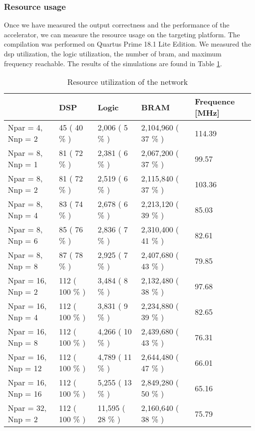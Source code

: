 \subsubsection{Resource usage}
%
Once we have measured the output correctness and the performance of the accelerator, we can measure the resource usage on the targeting platform. The compilation was performed on Quartus Prime 18.1 Lite Edition. We measured the \acrshort{dsp} utilization, the logic utilization, the number of \acrfull{bram}, and maximum frequency reachable. The results of the simulations are found in Table \ref{tab:res-simu}.
%
\begin{table}[H]
\begin{tabular}{|l|l|l|l|l|}
\hline
     & DSP & Logic  & BRAM & Frequence [MHz] \\ \hline
    Npar = 4, Nnp = 2 & 45  ( 40 \% ) & 2,006  ( 5 \% ) & 2,104,960  ( 37 \% ) & 114.39 \\ \hline
    Npar = 8, Nnp = 1 & 81 ( 72 \% ) & 2,381  ( 6 \% ) & 2,067,200  ( 37 \% ) & 99.57  \\ \hline
    Npar = 8, Nnp = 2 & 81  ( 72 \% ) & 2,519 ( 6 \% ) & 2,115,840  ( 37 \% ) & 103.36  \\ \hline
    Npar = 8, Nnp = 4 & 83  ( 74 \% ) & 2,678  ( 6 \% ) & 2,213,120 ( 39 \% ) & 85.03  \\ \hline
    Npar = 8, Nnp = 6 & 85  ( 76 \% ) & 2,836  ( 7 \% ) & 2,310,400  ( 41 \% ) & 82.61 \\ \hline
    Npar = 8, Nnp = 8 & 87 ( 78 \% ) & 2,925 ( 7 \% ) & 2,407,680  ( 43 \% ) & 79.85  \\ \hline
    Npar = 16, Nnp = 2 & 112 ( 100 \% ) & 3,484  ( 8 \% ) & 2,132,480 ( 38 \% ) & 97.68  \\ \hline
    Npar = 16, Nnp = 4 & 112  ( 100 \% ) & 3,831  ( 9 \% ) & 2,234,880 ( 39 \% ) & 82.65 \\ \hline
    Npar = 16, Nnp = 8 & 112  ( 100 \% ) & 4,266 ( 10 \% ) & 2,439,680 ( 43 \% ) & 76.31  \\ \hline
    Npar = 16, Nnp = 12 & 112  ( 100 \% ) & 4,789  ( 11 \% ) & 2,644,480  ( 47 \% ) & 66.01 \\ \hline
    Npar = 16, Nnp = 16 & 112 ( 100 \% ) & 5,255  ( 13 \% ) & 2,849,280 ( 50 \% ) & 65.16 \\ \hline
    Npar = 32, Nnp = 2 & 112 ( 100 \% ) & 11,595  ( 28 \% ) & 2,160,640  ( 38 \% ) & 75.79 \\ \hline
\end{tabular}
    \caption{Resource utilization of the network}
    \label{tab:res-simu}
\end{table}


